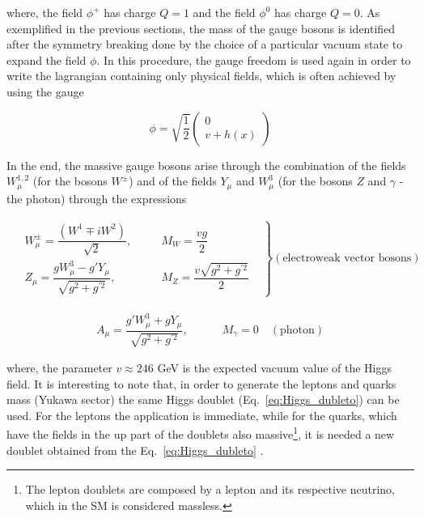 where, the field $\phi^{+}$ has charge $Q=1$ and the field $\phi^{0}$ has charge $Q=0$. As exemplified in the previous sections, the mass of the gauge bosons is identified after the symmetry breaking done by the choice of a particular vacuum state to expand the field $\phi$. In this procedure, the gauge freedom is used again in order to write the lagrangian containing only physical fields, which is often achieved by using the gauge

\begin{equation}
\phi = \sqrt{\dfrac{1}{2}} \left( \begin{aligned} 0 \quad \quad \\ v+h(x) \end{aligned} \right)
\end{equation}

In the end, the massive gauge bosons arise through the combination of the fields $W_{\mu}^{1,2}$ (for the bosons $W^{\pm}$) and of the fields $Y_{\mu}$ and $W_{\mu}^3$ (for the bosons $Z$ and $\gamma$ - the photon) through the expressions

\begin{eqnarray}
\left. \begin{aligned} &W_{\mu}^{\pm} = \dfrac{(W^1 \mp iW^2)}{\sqrt{2}},& \quad &M_W = \dfrac{vg}{2}&\\[0.1cm]
&Z_{\mu} = \dfrac{gW_{\mu}^3 - g' Y_{\mu}}{\sqrt{g^2+g^{'2}}},& \quad &M_Z = \dfrac{v\sqrt{g^2+g^{'2}}}{2}& \end{aligned} \right\} (\textrm{electroweak vector bosons})
\end{eqnarray}

\begin{eqnarray}
\left. A_{\mu} = \dfrac{g'W_{\mu}^3 + gY_{\mu}}{\sqrt{g^2+g^{'2}}}, \quad \quad \quad M_{\gamma} = 0 \quad \right. (\textrm{photon})
\end{eqnarray}

where, the parameter $v \approx 246$ GeV is the expected vacuum value of the Higgs field. It is interesting to note that, in order to generate the leptons and quarks mass (Yukawa sector) the same Higgs doublet (Eq.~\ref{eq:Higgs_dubleto}) can be used. For the leptons the application is immediate, while for the quarks, which have the fields in the up part of the doublets also massive\footnote{The lepton doublets are composed by a lepton and its respective neutrino, which in the SM is considered massless.}, it is needed a new doublet obtained from the Eq.~\ref{eq:Higgs_dubleto} \cite{bib:halzen-martin-1984}.


